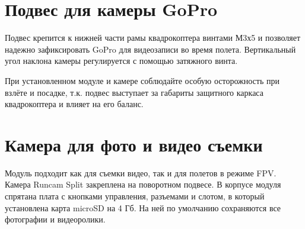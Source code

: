 \documentclass[a4paper,10pt,russian]{sphinxmanual}
\begin{document}
\begin{sphinxVerbatim}[commandchars=\\\{\}]
           
    
     
   
\end{sphinxVerbatim}


\section{Подвес для камеры GoPro}
\label{\detokenize{module/gopro:gopro}}\label{\detokenize{module/gopro::doc}}

Подвес крепится к нижней части рамы квадрокоптера винтами М3х5 и позволяет надежно зафиксировать GoPro для видеозаписи во время полета. Вертикальный угол наклона камеры регулируется с помощью затяжного винта.

При установленном модуле и камере соблюдайте особую осторожность при взлёте и посадке, т.к. подвес выступает за габариты защитного каркаса квадрокоптера и влияет на его баланс.


\section{Камера для фото и видео съемки}
\label{\detokenize{module/camera:id1}}\label{\detokenize{module/camera::doc}}

Модуль подходит как для съемки видео, так и для полетов в режиме FPV. Камера Runcam Split закреплена на поворотном подвесе. В корпусе модуля спрятана плата с кнопками управления, разъемами и слотом, в который установлена карта microSD на 4 Гб. На ней по умолчанию сохраняются все фотографии и видеоролики.
\end{document}
